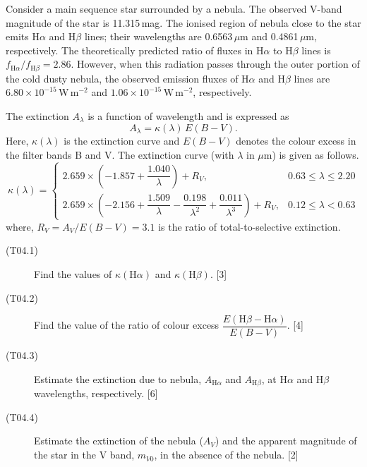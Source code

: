Consider a main sequence star surrounded by a nebula. The observed V-band
magnitude of the star is 11.315\,mag. The ionised region of nebula close to
the star emits H$\alpha$ and H$\beta$ lines; their wavelengths are
0.6563\,$\mu$m and 0.4861\,$\mu$m, respectively. The theoretically predicted
ratio of fluxes in H$\alpha$ to H$\beta$ lines is
$f_{\mathrm{H}\alpha}/f_{\mathrm{H}\beta} = 2.86$. However, when this
radiation passes through the outer portion of the cold dusty nebula, the
observed emission fluxes of H$\alpha$ and H$\beta$ lines are
$6.80 \times 10^{-15}\,\mathrm{W\,m^{-2}}$ and
$1.06 \times 10^{-15}\,\mathrm{W\,m^{-2}}$, respectively.

The extinction $A_\lambda$ is a function of wavelength and is expressed as
\[ A_\lambda = \kappa(\lambda)\,E(B-V). \]
Here, $\kappa(\lambda)$ is the extinction curve and $E(B-V)$ denotes the
colour excess in the filter bands B and V. The extinction curve (with
$\lambda$ in $\mu$m) is given as follows.
\[ \kappa(\lambda) =
   \begin{cases}
     2.659 \times \left( -1.857 + \dfrac{1.040}{\lambda} \right) + R_V, &
       0.63 \le \lambda \le 2.20 \\[1ex]
     2.659 \times \left( -2.156 + \dfrac{1.509}{\lambda}
       - \dfrac{0.198}{\lambda^2} + \dfrac{0.011}{\lambda^3} \right) + R_V, &
       0.12 \le \lambda < 0.63
   \end{cases} \]
where, $R_V = A_V/E(B-V) = 3.1$ is the ratio of total-to-selective extinction.

\begin{description}
\item[(T04.1)] Find the values of $\kappa(\mathrm{H}\alpha)$ and
  $\kappa(\mathrm{H}\beta)$. \hfill[3]
\item[(T04.2)] Find the value of the ratio of colour excess
  $\dfrac{E(\mathrm{H}\beta - \mathrm{H}\alpha)}{E(B-V)}$. \hfill[4]
\item[(T04.3)] Estimate the extinction due to nebula, $A_{\mathrm{H}\alpha}$
  and $A_{\mathrm{H}\beta}$, at H$\alpha$ and H$\beta$ wavelengths,
  respectively. \hfill[6]
\item[(T04.4)] Estimate the extinction of the nebula ($A_V$) and the apparent
  magnitude of the star in the V band, $m_{V0}$, in the absence of the nebula.
  \hfill[2]
\end{description}
